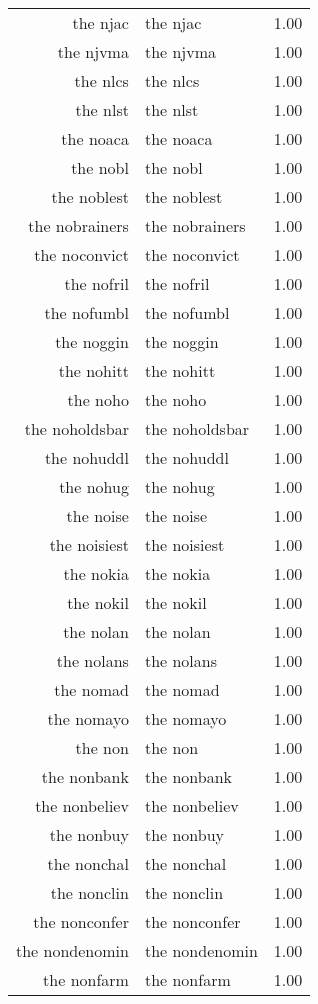 \begin{table}[ht]
\begin{tabular}{rlr}
  the njac & the njac & 1.00 \\ 
  the njvma & the njvma & 1.00 \\ 
  the nlcs & the nlcs & 1.00 \\ 
  the nlst & the nlst & 1.00 \\ 
  the noaca & the noaca & 1.00 \\ 
  the nobl & the nobl & 1.00 \\ 
  the noblest & the noblest & 1.00 \\ 
  the nobrainers & the nobrainers & 1.00 \\ 
  the noconvict & the noconvict & 1.00 \\ 
  the nofril & the nofril & 1.00 \\ 
  the nofumbl & the nofumbl & 1.00 \\ 
  the noggin & the noggin & 1.00 \\ 
  the nohitt & the nohitt & 1.00 \\ 
  the noho & the noho & 1.00 \\ 
  the noholdsbar & the noholdsbar & 1.00 \\ 
  the nohuddl & the nohuddl & 1.00 \\ 
  the nohug & the nohug & 1.00 \\ 
  the noise & the noise & 1.00 \\ 
  the noisiest & the noisiest & 1.00 \\ 
  the nokia & the nokia & 1.00 \\ 
  the nokil & the nokil & 1.00 \\ 
  the nolan & the nolan & 1.00 \\ 
  the nolans & the nolans & 1.00 \\ 
  the nomad & the nomad & 1.00 \\ 
  the nomayo & the nomayo & 1.00 \\ 
  the non & the non & 1.00 \\ 
  the nonbank & the nonbank & 1.00 \\ 
  the nonbeliev & the nonbeliev & 1.00 \\ 
  the nonbuy & the nonbuy & 1.00 \\ 
  the nonchal & the nonchal & 1.00 \\ 
  the nonclin & the nonclin & 1.00 \\ 
  the nonconfer & the nonconfer & 1.00 \\ 
  the nondenomin & the nondenomin & 1.00 \\ 
  the nonfarm & the nonfarm & 1.00 \\ 

\end{tabular}
\end{table}
